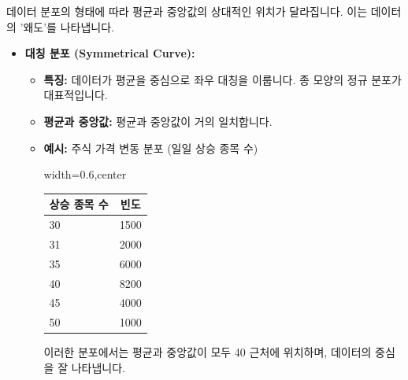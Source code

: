 \documentclass[11pt,a4paper]{article}
\theoremstyle{definition}
\begin{document}
\begin{infobox}[title=평균과 중앙값의 관계: 분포의 왜도 (Skewness)]
데이터 분포의 형태에 따라 평균과 중앙값의 상대적인 위치가 달라집니다. 이는 데이터의 '왜도'를 나타냅니다.

\begin{itemize}
    \item \textbf{대칭 분포 (Symmetrical Curve):}
    \begin{itemize}
        \item \textbf{특징:} 데이터가 평균을 중심으로 좌우 대칭을 이룹니다. 종 모양의 정규 분포가 대표적입니다.
        \item \textbf{평균과 중앙값:} 평균과 중앙값이 거의 일치합니다.
        \item \textbf{예시:} 주식 가격 변동 분포 (일일 상승 종목 수)
        \begin{adjustbox}{width=0.6\textwidth,center}
        \begin{tabular}{lc}
        \toprule
        \textbf{상승 종목 수} & \textbf{빈도} \\
        \midrule
        30 & 1500 \\
        31 & 2000 \\
        35 & 6000 \\
        40 & 8200 \\
        45 & 4000 \\
        50 & 1000 \\
        \bottomrule
        \end{tabular}
        \end{adjustbox}
        \label{tab:symmetrical_curve}
        이러한 분포에서는 평균과 중앙값이 모두 40 근처에 위치하며, 데이터의 중심을 잘 나타냅니다.
    \end{itemize}


\end{itemize}
\end{infobox}
\end{document}
